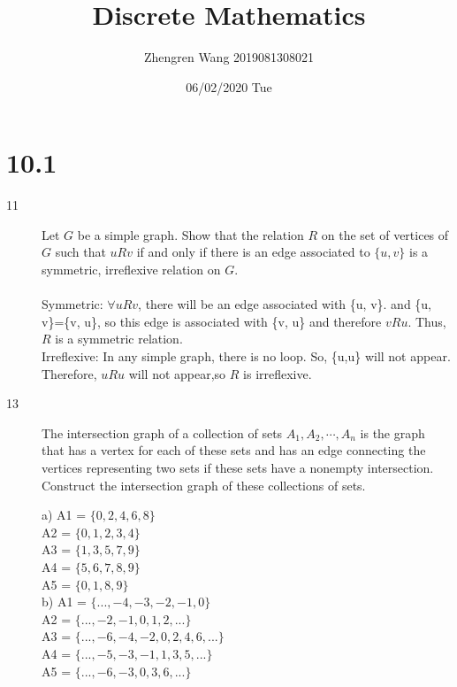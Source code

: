 \documentclass[UTF8]{article}
\title{Discrete Mathematics}
\author{Zhengren Wang 2019081308021}
\date{06/02/2020 Tue}
\begin{document}
\maketitle 
\part{10.1}
\begin{description}
    \item[11]Let $G$ be a simple graph. Show that the relation $R$ on the set of vertices of $G$ such that $uRv$ if and only if there is an edge associated to $\{u, v\}$ is a symmetric, irreflexive relation on $G$.  \\\\
        Symmetric: $\forall uRv$, there will be an edge associated with \{u, v\}. and \{u, v\}=\{v, u\}, so this edge is associated with \{v, u\} and therefore $vRu$. Thus, $R$ is a symmetric relation.  \\
        Irreflexive: In any simple graph, there is no loop. So, \{u,u\} will not appear. Therefore, $uRu$ will not appear,so $R$ is irreflexive.
    \item[13]The intersection graph of a collection of sets $A_1, A_2,\cdots,A_n$ is the graph that has a vertex for each of these sets and has an edge connecting the vertices representing two sets if these sets have a nonempty intersection. Construct the intersection graph of these collections of sets.

            a) A1 = $\{0, 2, 4, 6, 8\}$ \\
               A2 = $\{0, 1, 2, 3, 4\}$ \\
               A3 = $\{1, 3, 5, 7, 9\}$ \\
               A4 = $\{5, 6, 7, 8, 9\}$ \\
               A5 = $\{0, 1, 8, 9\}$    \\

            b) A1 = $\{..., −4, −3, −2, −1, 0\}$          \\
               A2 = $\{..., −2, −1, 0, 1, 2,...\}$        \\
               A3 = $\{..., −6, −4, −2, 0, 2, 4, 6,...\}$ \\
               A4 = $\{..., −5, −3, −1, 1, 3, 5,...\}$    \\
               A5 = $\{..., −6, −3, 0, 3, 6,...\}$         \\


\end{description}
\end{document}
